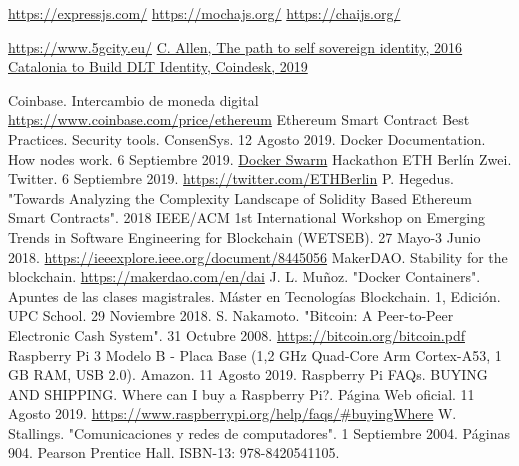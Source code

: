 \documentclass[12pt]{amsart}
\begin{document}
\begin{multicols}{2}
\begin{thebibliography}{9}
  \href{https://expressjs.com/}{https://expressjs.com/}
  \href{https://mochajs.org/}{https://mochajs.org/}
  \href{https://chaijs.org/}{https://chaijs.org/}

 \href{https://www.5gcity.eu/}{https://www.5gcity.eu/}
  \href{http://www.lifewithalacrity.com/2016/04/the-path-to-self-soverereign-identity.html}
  {C. Allen, The path to self sovereign identity, 2016}
  \href{https://www.coindesk.com/catalonia-government-to-build-dlt-based-identity-platform-for-citizens}
       {Catalonia to Build DLT Identity, Coindesk, 2019}


 Coinbase. Intercambio de moneda digital \href{https://www.coinbase.com/price/ethereum}{https://www.coinbase.com/price/ethereum}
 Ethereum Smart Contract Best Practices. Security tools. ConsenSys. 12 Agosto 2019.
 Docker Documentation. How nodes work. 6 Septiembre 2019.  \href{https://docs.docker.com/engine/swarm/how-swarm-mode-works/nodes/}{Docker Swarm}
 Hackathon ETH Berlín Zwei. Twitter. 6 Septiembre 2019. \href{https://twitter.com/ETHBerlin}{https://twitter.com/ETHBerlin}
 P. Hegedus. "Towards Analyzing the Complexity Landscape of Solidity Based Ethereum Smart Contracts". 2018 IEEE/ACM 1st International Workshop on Emerging Trends in Software Engineering for Blockchain (WETSEB). 27 Mayo-3 Junio 2018. \href{https://ieeexplore.ieee.org/document/8445056}{https://ieeexplore.ieee.org/document/8445056}
 MakerDAO. Stability for the blockchain.  \href{https://makerdao.com/en/dai}{https://makerdao.com/en/dai}
 J. L. Muñoz. "Docker Containers". Apuntes de las clases magistrales. Máster en Tecnologías Blockchain. 1, Edición. UPC School. 29 Noviembre 2018.
 S. Nakamoto. "Bitcoin: A Peer-to-Peer Electronic Cash System". 31 Octubre 2008.  \href{https://bitcoin.org/bitcoin.pdf}{https://bitcoin.org/bitcoin.pdf}
 Raspberry Pi 3 Modelo B - Placa Base (1,2 GHz Quad-Core Arm Cortex-A53, 1 GB RAM, USB 2.0). Amazon. 11 Agosto 2019.
 Raspberry Pi FAQs. BUYING AND SHIPPING. Where can I buy a Raspberry Pi?. Página Web oficial. 11 Agosto 2019.  \href{https://www.raspberrypi.org/help/faqs/#buyingWhere}{https://www.raspberrypi.org/help/faqs/\#buyingWhere}
 W. Stallings. "Comunicaciones y redes de computadores". 1 Septiembre 2004. Páginas 904. Pearson Prentice Hall. ISBN-13: 978-8420541105.




\end{thebibliography}
\end{multicols}
\end{document}
